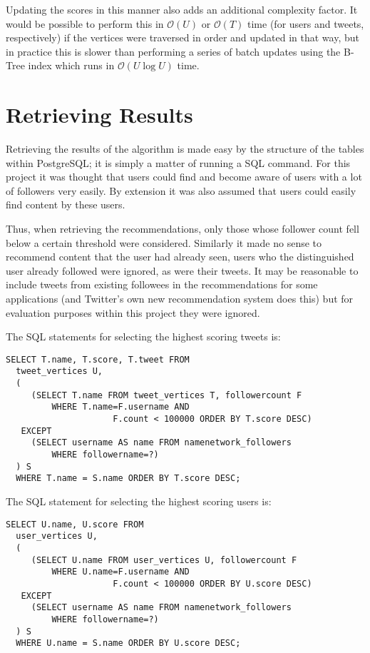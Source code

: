 Updating the scores in this manner also adds an additional complexity factor. It would be possible to perform this in $\mathcal{O}(U)$ or $\mathcal{O}(T)$ time (for users and tweets, respectively) if the vertices were traversed in order and updated in that way, but in practice this is slower than performing a series of batch updates using the B-Tree index which runs in $\mathcal{O}(U \log U)$ time. 


\section{Retrieving Results}
\label{sec:RetrievingResults}

Retrieving the results of the algorithm is made easy by the structure of the tables within PostgreSQL; it is simply a matter of running a SQL command. For this project it was thought that users could find and become aware of users with a lot of followers very easily. By extension it was also assumed that users could easily find content by these users.

Thus, when retrieving the recommendations, only those whose follower count fell below a certain threshold were considered. Similarly it made no sense to recommend content that the user had already seen, users who the distinguished user already followed were ignored, as were their tweets. It may be reasonable to include tweets from existing followees in the recommendations for some applications (and Twitter's own new recommendation system does this) but for evaluation purposes within this project they were ignored.

The SQL statements for selecting the highest scoring tweets is:

\begin{verbatim}
SELECT T.name, T.score, T.tweet FROM
  tweet_vertices U,
  (
     (SELECT T.name FROM tweet_vertices T, followercount F
         WHERE T.name=F.username AND
                     F.count < 100000 ORDER BY T.score DESC)
   EXCEPT
     (SELECT username AS name FROM namenetwork_followers
         WHERE followername=?)
  ) S
  WHERE T.name = S.name ORDER BY T.score DESC;
\end{verbatim}

\noindent
The SQL statement for selecting the highest scoring users is:

\begin{verbatim}
SELECT U.name, U.score FROM
  user_vertices U,
  (
     (SELECT U.name FROM user_vertices U, followercount F
         WHERE U.name=F.username AND
                     F.count < 100000 ORDER BY U.score DESC)
   EXCEPT
     (SELECT username AS name FROM namenetwork_followers
         WHERE followername=?)
  ) S
  WHERE U.name = S.name ORDER BY U.score DESC;
\end{verbatim}


